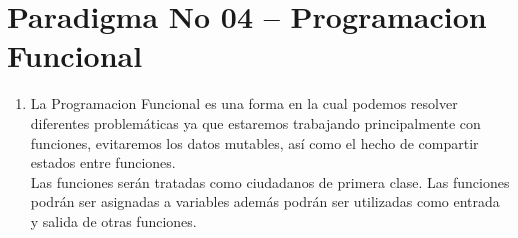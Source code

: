 \section{Paradigma No 04 – Programacion Funcional} 

\begin{enumerate}[1.]
	\item La Programacion Funcional  es una forma en la cual podemos resolver diferentes problemáticas ya que estaremos trabajando principalmente con funciones, evitaremos los datos mutables, así como el hecho de compartir estados entre funciones.
	\\Las funciones serán tratadas como ciudadanos de primera clase. Las funciones podrán ser asignadas a variables además podrán ser utilizadas como entrada y salida de otras funciones.
	

\end{enumerate}

